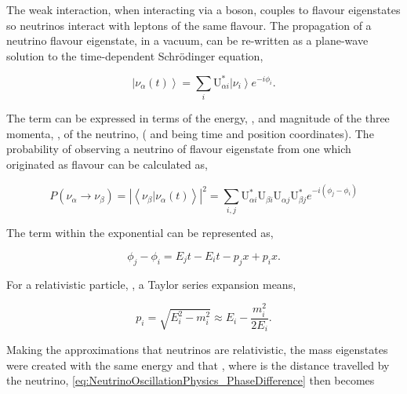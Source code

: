The weak interaction, when interacting via a  boson, couples to flavour eigenstates so neutrinos interact with leptons of the same flavour. The propagation of a neutrino flavour eigenstate, in a vacuum, can be re-written as a plane-wave solution to the time-dependent Schr{\"o}dinger equation,

\begin{equation}
  \label{eq:NeutrinoOscillationPhysics_TimeDepSuperposition}
  \left|\nu_{\alpha}(t)\right> = \sum_{i}\mathrm{U}^{*}_{\alpha i}\left|\nu_{i}\right>e^{-i \phi_{i}}.
\end{equation}

The  term can be expressed in terms of the energy, , and magnitude of the three momenta, , of the neutrino,  ( and  being time and position coordinates). The probability of observing a neutrino of flavour eigenstate \quickmath{\beta} from one which originated as flavour \quickmath{\alpha} can be calculated as,

\begin{equation}
  \label{eq:NeutrinoOscillationPhysics_ProbabilityComplexForm}
  P(\nu_{\alpha} \rightarrow \nu_{\beta}) = \left| \left< \nu_{\beta} | \nu_{\alpha}(t) \right> \right|^{2} = \sum_{i,j} \mathrm{U}^{*}_{\alpha i}\mathrm{U}_{\beta i}\mathrm{U}_{\alpha j}\mathrm{U}^{*}_{\beta j} e^{-i(\phi_{j}-\phi_{i})}
\end{equation}

The term within the exponential can be represented as,

\begin{equation}
  \label{eq:NeutrinoOscillationPhysics_PhaseDifference}
  \phi_{j}-\phi_{i} = E_{j}t - E_{i}t - p_{j}x + p_{i}x .
\end{equation}

For a relativistic particle, , a Taylor series expansion means,

\begin{equation}
  p_{i} = \sqrt{E^{2}_{i} - m^{2}_{i}} \approx E_{i} - \frac{m^{2}_{i}}{2E_{i}}.
\end{equation}

Making the approximations that neutrinos are relativistic, the mass eigenstates were created with the same energy and that , where  is the distance travelled by the neutrino, \autoref{eq:NeutrinoOscillationPhysics_PhaseDifference} then becomes

